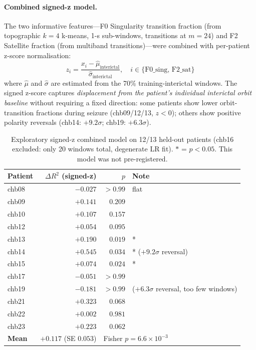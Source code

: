 \documentclass[11pt]{article}
\begin{document}
\paragraph{Combined signed-z model.}
The two informative features---F0 Singularity transition fraction (from topographic
$k=4$ k-means, 1-s sub-windows, transitions at $m=24$) and F2 Satellite fraction
(from multiband transitions)---were combined with per-patient z-score normalisation:
\[
  z_i = \frac{x_i - \hat{\mu}_\text{interictal}}{\hat{\sigma}_\text{interictal}},
  \quad i \in \{\text{F0\_sing},\, \text{F2\_sat}\}
\]
where $\hat{\mu}$ and $\hat{\sigma}$ are estimated from the 70\% training-interictal
windows.  The signed z-score captures \emph{displacement from the patient's individual
interictal orbit baseline} without requiring a fixed direction: some patients show
lower orbit-transition fractions during seizure (chb09/12/13, $z < 0$);
others show positive polarity reversals (chb14: $+9.2\sigma$; chb19: $+6.3\sigma$).

\begin{table}[h]
\centering
\small
\begin{tabular}{lrrl}
\toprule
\textbf{Patient} & $\Delta R^2$ (signed-z) & $p$ & \textbf{Note} \\
\midrule
chb08 & $-0.027$ & $>0.99$ & flat \\
chb09 & $+0.141$ & $0.209$ & \\
chb10 & $+0.107$ & $0.157$ & \\
chb12 & $+0.054$ & $0.095$ & \\
chb13 & $+0.190$ & $0.019$ & * \\
chb14 & $+0.545$ & $0.034$ & * ($+9.2\sigma$ reversal) \\
chb15 & $+0.074$ & $0.024$ & * \\
chb17 & $-0.051$ & $>0.99$ & \\
chb19 & $-0.181$ & $>0.99$ & ($+6.3\sigma$ reversal, too few windows) \\
chb21 & $+0.323$ & $0.068$ & \\
chb22 & $+0.002$ & $0.981$ & \\
chb23 & $+0.223$ & $0.062$ & \\
\midrule
\textbf{Mean} & $+0.117$ (SE $0.053$) & \multicolumn{2}{l}{Fisher $p = 6.6 \times 10^{-3}$} \\
\bottomrule
\end{tabular}
\caption{Exploratory signed-z combined model on 12/13 held-out patients
(chb16 excluded: only 20 windows total, degenerate LR fit).
$*$ = $p < 0.05$.  This model was not pre-registered.}
\label{tab:replication}
\end{table}
\end{document}

